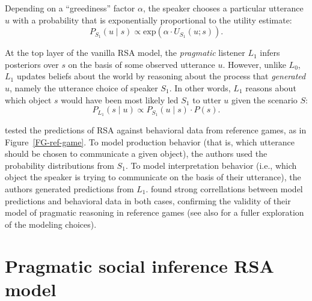 \documentclass[11pt,a4paper]{article}
\begin{document}
Depending on a ``greediness'' factor $\alpha$, the speaker chooses a particular utterance $u$ with a probability that is exponentially proportional to the utility estimate: 
\begin{equation}
P_{S_{1}} (u \mid s) \propto   \textrm{exp}(\alpha \cdot U_{S_{1}} (u;s)).
\end{equation}


At the top layer of the vanilla RSA model, the \emph{pragmatic} listener $L_1$ infers posteriors over $s$ on the basis of some observed utterance $u$.
However, unlike $L_0$, $L_1$ updates beliefs about the world by reasoning about the process that \emph{generated} $u$, namely the utterance choice of speaker $S_1$.
In other words, $L_1$ reasons about which object $s$ would have been most likely led $S_1$ to utter $u$ given the scenario $S$:
\begin{equation}
P_{L_{1}}(s \mid u) \propto P_{S_{1}}(u \mid s) \cdot P(s).
\end{equation}


 tested the predictions of RSA against behavioral data from reference games, as in Figure~\ref{FG-ref-game}.
To model production behavior (that is, which utterance should be chosen to communicate a given object), the authors used the probability distributions from $S_1$.
To model interpretation behavior (i.e., which object the speaker is trying to communicate on the basis of their utterance), the authors generated predictions from $L_1$.
\citeauthor{frankgoodman2012} found strong correllations between model predictions and behavioral data in both cases, confirming the validity of their model of pragmatic reasoning in reference games (see also  for a fuller exploration of the modeling choices).



\section{Pragmatic social inference RSA model}
\end{document}
